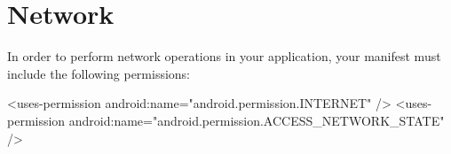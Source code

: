 
\chapter{Network}
In order to perform network operations in your application, your manifest must include the following permissions:

\begin{xml}
	<uses-permission android:name="android.permission.INTERNET" />
	<uses-permission android:name="android.permission.ACCESS_NETWORK_STATE" />
	
\end{xml}
